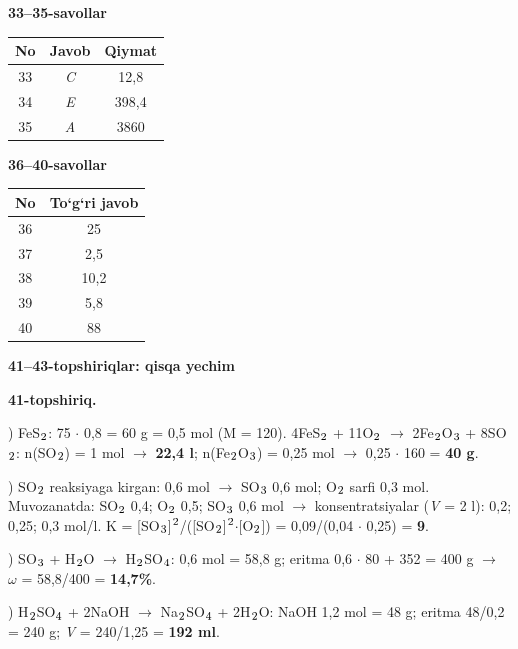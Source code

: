 \documentclass[11pt,a4paper]{article}
\renewcommand{\textsubscript}[1]{\ensuremath{_{\text{\fontsize{8}{8}\selectfont #1}}}}
\renewcommand{\textsuperscript}[1]{\ensuremath{^{\text{\fontsize{8}{8}\selectfont #1}}}}
\begin{document}
\noindent\textbf{33--35-savollar}\par\smallskip
\noindent\begin{tabular}{|c|c|c|}\hline \textbf{No} & \textbf{Javob} & \textbf{Qiymat}\\\hline
33 & \textsl{C} & 12,8\\\hline
34 & \textsl{E} & 398,4\\\hline
35 & \textsl{A} & 3860\\\hline
\end{tabular}\par\medskip
\noindent\textbf{36--40-savollar}\par\smallskip
\noindent\begin{tabular}{|c|c|}\hline \textbf{No} & \textbf{To`g`ri javob}\\\hline
36 & 25\\\hline
37 & 2,5\\\hline
38 & 10,2\\\hline
39 & 5,8\\\hline
40 & 88\\\hline
\end{tabular}\par\medskip
\noindent\textbf{41--43-topshiriqlar: qisqa yechim}\par\smallskip
\noindent\textbf{41-topshiriq.}\par
{}) FeS\textsubscript{2}: 75 $\cdot$ 0,8 = 60 g = 0,5 mol (M = 120). 4FeS\textsubscript{2} + 11O\textsubscript{2} $\to$ 2Fe\textsubscript{2}O\textsubscript{3} + 8SO\textsubscript{2}: n(SO\textsubscript{2}) = 1 mol $\to$ \textbf{22,4 l}; n(Fe\textsubscript{2}O\textsubscript{3}) = 0,25 mol $\to$ 0,25 $\cdot$ 160 = \textbf{40 g}.\par
{}) SO\textsubscript{2} reaksiyaga kirgan: 0,6 mol $\to$ SO\textsubscript{3} 0,6 mol; O\textsubscript{2} sarfi 0,3 mol. Muvozanatda: SO\textsubscript{2} 0,4; O\textsubscript{2} 0,5; SO\textsubscript{3} 0,6 mol $\to$ konsentratsiyalar (\textit{V} = 2 l): 0,2; 0,25; 0,3 mol/l. K = [SO\textsubscript{3}]\textsuperscript{2}/([SO\textsubscript{2}]\textsuperscript{2}$\cdot$[O\textsubscript{2}]) = 0,09/(0,04 $\cdot$ 0,25) = \textbf{9}.\par
{}) SO\textsubscript{3} + H\textsubscript{2}O $\to$ H\textsubscript{2}SO\textsubscript{4}: 0,6 mol = 58,8 g; eritma 0,6 $\cdot$ 80 + 352 = 400 g $\to$ $\omega$ = 58,8/400 = \textbf{14,7\%}.\par
{}) H\textsubscript{2}SO\textsubscript{4} + 2NaOH $\to$ Na\textsubscript{2}SO\textsubscript{4} + 2H\textsubscript{2}O: NaOH 1,2 mol = 48 g; eritma 48/0,2 = 240 g; \textit{V} = 240/1,25 = \textbf{192 ml}.\par
\end{document}
